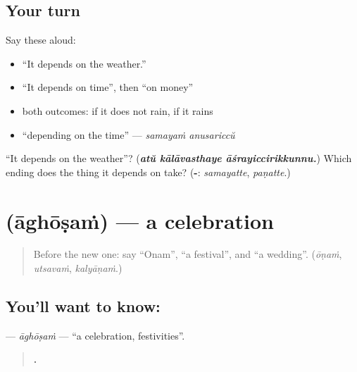 \subsection*{Your turn}
Say these aloud:

\begin{itemize}
\raggedright
  \item \textquotedblleft{}It depends on the weather.\textquotedblright{}
  \item \textquotedblleft{}It depends on time\textquotedblright{}, then \textquotedblleft{}on money\textquotedblright{}
  \item both outcomes: if it does not rain, if it rains
  \item \textquotedblleft{}depending on the time\textquotedblright{} — \emph{samayaṁ anusariccŭ}
\end{itemize}

\begin{tcolorbox}[breakable,colback=teal!4,colframe=teal!35!black,title={Before you move on}]
\textquotedblleft{}It depends on the weather\textquotedblright{}? (\emph{\textbf{atŭ kālāvasthaye āśrayiccirikkunnu.}}) Which ending does the thing it depends on take? (\textbf{-}: \emph{samayatte}, \emph{paṇatte}.)
\end{tcolorbox}
\section[\texorpdfstring{\ml{ആഘോഷം} (āghōṣaṁ)}{ആഘോഷം (āghōṣaṁ)}]{ (āghōṣaṁ) — a celebration}

\label{lesson:ML-C348-aghosham}



\begin{quote}
Before the new one: say \textquotedblleft{}Onam\textquotedblright{}, \textquotedblleft{}a festival\textquotedblright{}, and \textquotedblleft{}a wedding\textquotedblright{}. (\emph{ōṇaṁ}, \emph{utsavaṁ}, \emph{kalyāṇaṁ}.)
\end{quote}

\subsection*{You'll want to know: }
\textbf{} — \emph{āghōṣaṁ} — \textquotedblleft{}a celebration, festivities\textquotedblright{}.

\begin{quote}
\textbf{    .}
\end{quote}

